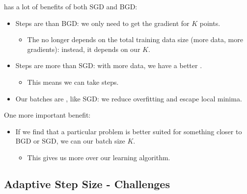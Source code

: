             \begin{concept}
                 has a lot of benefits of both SGD and BGD:
                
                \begin{itemize}
                    \item Steps are  than BGD: we only need to get the gradient for $K$ points.
                        \begin{itemize}
                            \item The  no longer depends on the total training data size (more data, more gradients): instead, it depends on our  $K$.
                        \end{itemize}
                        
                    \item Steps are more  than SGD: with more data, we have a better .
                        \begin{itemize}
                            \item This means we can take  steps.
                        \end{itemize}
                    
                    \item Our batches are , like SGD: we reduce overfitting and escape local minima.
                \end{itemize}

                \phantom{}
                
                One more important benefit:
                
                \begin{itemize}
                    \item If we find that a particular problem is better suited for something closer to BGD or SGD, we can  our batch size $K$.
                        \begin{itemize}
                            \item This gives us more  over our learning algorithm.
                        \end{itemize}
                \end{itemize}
            \end{concept}
        
    \phantom{}
    \pagebreak
    \subsection{Adaptive Step Size - Challenges}
    
